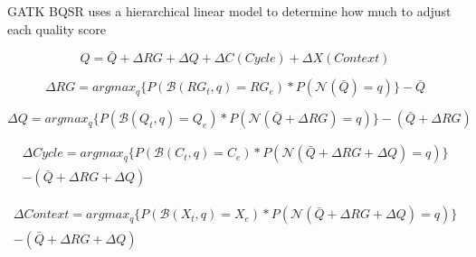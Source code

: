 \documentclass[table]{beamer}
\begin{document}
\begin{frame}{GATK BQSR uses a hierarchical linear model to determine how much to adjust each quality score}

\begin{displaymath}
Q = \bar{Q} + \Delta RG + \Delta{} Q + \Delta{} C (Cycle) + \Delta{} X (Context)
\end{displaymath}

\begin{displaymath}
\Delta{}RG = argmax_{q}\{P(\mathcal{B}(RG_{t},q) = RG_{e}) * P(\mathcal{N}(\bar{Q}) = q)\} - \bar{Q}
\end{displaymath}

\begin{displaymath}
\Delta Q = argmax_{q}\{P(\mathcal{B}(Q_{t},q) = Q_{e}) * P(\mathcal{N}(\bar{Q} + \Delta RG) = q)\} - (\bar{Q} + \Delta RG)
\end{displaymath}

\begin{multline}
\Delta Cycle = argmax_{q}\{P(\mathcal{B}(C_{t},q) = C_{e}) * P(\mathcal{N}(\bar{Q} + \Delta RG + \Delta Q) = q)\} \\ - (\bar{Q} + \Delta RG + \Delta Q)
\end{multline}

\begin{multline}
\Delta Context = argmax_{q}\{P(\mathcal{B}(X_{t},q) = X_{e}) * P(\mathcal{N}(\bar{Q} + \Delta RG + \Delta Q) = q)\} \\ - (\bar{Q} + \Delta RG + \Delta Q)
\end{multline}

\end{frame}




\end{document}
